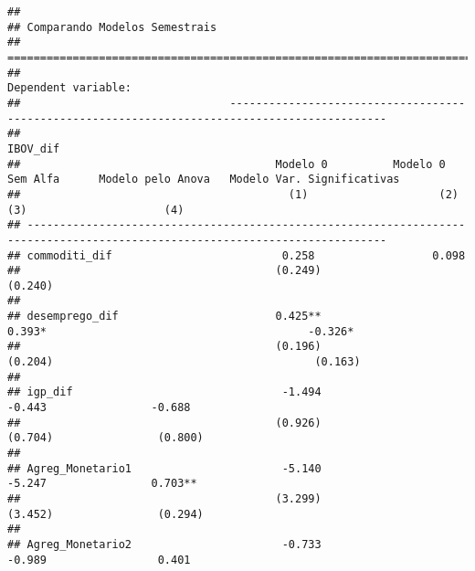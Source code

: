\documentclass[
]{article}
\begin{document}
\begin{verbatim}
## 
## Comparando Modelos Semestrais
## =============================================================================================================================
##                                                                     Dependent variable:                                      
##                                ----------------------------------------------------------------------------------------------
##                                                                           IBOV_dif                                           
##                                       Modelo 0          Modelo 0 Sem Alfa      Modelo pelo Anova   Modelo Var. Significativas
##                                         (1)                    (2)                    (3)                     (4)            
## -----------------------------------------------------------------------------------------------------------------------------
## commoditi_dif                          0.258                  0.098                                                          
##                                       (0.249)                (0.240)                                                         
##                                                                                                                              
## desemprego_dif                        0.425**                 0.393*                                        -0.326*          
##                                       (0.196)                (0.204)                                        (0.163)          
##                                                                                                                              
## igp_dif                                -1.494                 -0.443                -0.688                                   
##                                       (0.926)                (0.704)                (0.800)                                  
##                                                                                                                              
## Agreg_Monetario1                       -5.140                 -5.247                0.703**                                  
##                                       (3.299)                (3.452)                (0.294)                                  
##                                                                                                                              
## Agreg_Monetario2                       -0.733                 -0.989                 0.401                                   

\end{verbatim}
\end{document}

